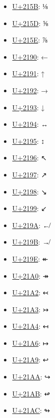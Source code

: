 \begin{itemize}
	\item \href{https://www.compart.com/en/unicode/U+215B}{U+215B}: ⅛
	\item \href{https://www.compart.com/en/unicode/U+215D}{U+215D}: ⅝
	\item \href{https://www.compart.com/en/unicode/U+215E}{U+215E}: ⅞
	\item \href{https://www.compart.com/en/unicode/U+2190}{U+2190}: ←
	\item \href{https://www.compart.com/en/unicode/U+2191}{U+2191}: ↑
	\item \href{https://www.compart.com/en/unicode/U+2192}{U+2192}: →
	\item \href{https://www.compart.com/en/unicode/U+2193}{U+2193}: ↓
	\item \href{https://www.compart.com/en/unicode/U+2194}{U+2194}: ↔
	\item \href{https://www.compart.com/en/unicode/U+2195}{U+2195}: ↕
	\item \href{https://www.compart.com/en/unicode/U+2196}{U+2196}: ↖
	\item \href{https://www.compart.com/en/unicode/U+2197}{U+2197}: ↗
	\item \href{https://www.compart.com/en/unicode/U+2198}{U+2198}: ↘
	\item \href{https://www.compart.com/en/unicode/U+2199}{U+2199}: ↙
	\item \href{https://www.compart.com/en/unicode/U+219A}{U+219A}: ↚
	\item \href{https://www.compart.com/en/unicode/U+219B}{U+219B}: ↛
	\item \href{https://www.compart.com/en/unicode/U+219E}{U+219E}: ↞
	\item \href{https://www.compart.com/en/unicode/U+21A0}{U+21A0}: ↠
	\item \href{https://www.compart.com/en/unicode/U+21A2}{U+21A2}: ↢
	\item \href{https://www.compart.com/en/unicode/U+21A3}{U+21A3}: ↣
	\item \href{https://www.compart.com/en/unicode/U+21A4}{U+21A4}: ↤
	\item \href{https://www.compart.com/en/unicode/U+21A6}{U+21A6}: ↦
	\item \href{https://www.compart.com/en/unicode/U+21A9}{U+21A9}: ↩
	\item \href{https://www.compart.com/en/unicode/U+21AA}{U+21AA}: ↪
	\item \href{https://www.compart.com/en/unicode/U+21AB}{U+21AB}: ↫
	\item \href{https://www.compart.com/en/unicode/U+21AC}{U+21AC}: ↬

\end{itemize}
